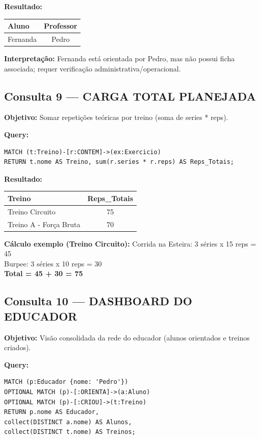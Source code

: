 \documentclass[12pt,a4paper]{article}
\begin{document}
\textbf{Resultado:}
\begin{table}[h]
\centering
\begin{tabular}{lc}
\toprule
Aluno & Professor \\
\midrule
Fernanda & Pedro \\
\bottomrule
\end{tabular}
\end{table}

\textbf{Interpretação:} Fernanda está orientada por Pedro, mas não possui ficha associada; requer verificação administrativa/operacional.

\subsection{Consulta 9 — CARGA TOTAL PLANEJADA}

\textbf{Objetivo:} Somar repetições teóricas por treino (soma de series * reps).

\textbf{Query:}
\lstset{caption=Consulta 9 - Carga Total Planejada}
\begin{lstlisting}
MATCH (t:Treino)-[r:CONTEM]->(ex:Exercicio)
RETURN t.nome AS Treino, sum(r.series * r.reps) AS Reps_Totais;
\end{lstlisting}

\textbf{Resultado:}
\begin{table}[h]
\centering
\begin{tabular}{lc}
\toprule
Treino & Reps\_Totais \\
\midrule
Treino Circuito & 75 \\
Treino A - Força Bruta & 70 \\
\bottomrule
\end{tabular}
\end{table}

\textbf{Cálculo exemplo (Treino Circuito):}
Corrida na Esteira: 3 séries x 15 reps = 45 \\
Burpee: 3 séries x 10 reps = 30 \\
\textbf{Total = 45 + 30 = 75}

\subsection{Consulta 10 — DASHBOARD DO EDUCADOR}

\textbf{Objetivo:} Visão consolidada da rede do educador (alunos orientados e treinos criados).

\textbf{Query:}
\lstset{caption=Consulta 10 - Dashboard do Educador}
\begin{lstlisting}
MATCH (p:Educador {nome: 'Pedro'})
OPTIONAL MATCH (p)-[:ORIENTA]->(a:Aluno)
OPTIONAL MATCH (p)-[:CRIOU]->(t:Treino)
RETURN p.nome AS Educador,
collect(DISTINCT a.nome) AS Alunos,
collect(DISTINCT t.nome) AS Treinos;
\end{lstlisting}
\end{document}
